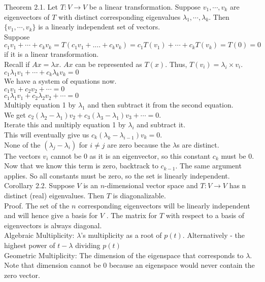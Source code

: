 \documentclass[12pt]{article}
\begin{document}
Theorem 2.1. Let $T: V \to V$ be a linear transformation. Suppose $v_1,\cdots, v_k$ are eigenvectors of $T$ with distinct corresponding eigenvalues $\lambda_1,\cdots, \lambda_k$. Then $\{v_1 ,\cdots, v_k \}$ is a
linearly independent set of vectors.\\
Suppose $c_1v_1+ \cdots +c_kv_k=
T(c_1v_1+....+c_kv_k) = c_1T(v_1)+\cdots +c_kT(v_k) = T(0) = 0$ if it is a linear transformation.\\
Recall if $Ax= \lambda x$. $Ax$ can be represented as $T(x)$. Thus, $T(v_i) =  \lambda_i \times v_i$.\\
$c_1 \lambda_1 v_1+ \cdots + c_k \lambda_k v_k = 0$\\
We have a system of equations now. \\
$c_1v_1 + c_2v_2 + \cdots = 0$\\
$c_1 \lambda_1 v_1 + c_2 \lambda_2 v_2 + \cdots = 0$\\
Multiply equation 1 by $\lambda_1$ and then subtract it from the second equation.\\
We get $c_2(\lambda_2 - \lambda_1) v_2 + c_3 (\lambda_3 - \lambda_1) v_3 + \cdots = 0$.\\
Iterate this and multiply equation 1 by $\lambda_i$ and subtract it.\\
This will eventually give us $c_k (\lambda_k - \lambda_{i-1}) v_k = 0$.\\
None of the $(\lambda_j - \lambda_i)$ for $i \neq j$ are zero because the $\lambda$s are distinct.\\
The vectors $v_i$ cannot be 0 as it is an eigenvector, so this constant $c_k$ must be 0. Now that we know this term is zero, backtrack to $c_{k-1}$. The same argument applies. So all constants must be zero, so the set is linearly independent.\\

Corollary 2.2. Suppose $V$ is an $n$-dimensional vector space and $T : V \to V$ has n distinct
(real) eigenvalues. Then $T$ is diagonalizable.\\
Proof. The set of the $n$ corresponding eigenvectors will be linearly independent and will
hence give a basis for $V$ . The matrix for $T$ with respect to a basis of eigenvectors is always diagonal.\\

Algebraic Multiplicity: $\lambda$’s multiplicity as a root of $p(t)$. Alternatively - the highest power of $t-\lambda$ dividing $p(t)$\\
Geometric Multiplicity: The dimension of the eigenspace that corresponds to $\lambda$.
Note that dimension cannot be 0 because an eigenspace would never contain the zero vector.\\
\end{document}
